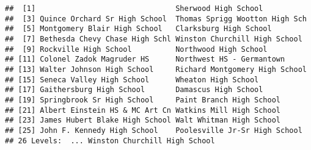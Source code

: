\documentclass[]{article}
\newenvironment{Shaded}{\begin{snugshade}}{\end{snugshade}}
\newcommand{\KeywordTok}[1]{\textcolor[rgb]{0.13,0.29,0.53}{\textbf{#1}}}
\newcommand{\OperatorTok}[1]{\textcolor[rgb]{0.81,0.36,0.00}{\textbf{#1}}}
\newcommand{\NormalTok}[1]{#1}
\begin{document}
\begin{Shaded}
\end{Shaded}

\begin{verbatim}
##  [1]                                Sherwood High School          
##  [3] Quince Orchard Sr High School  Thomas Sprigg Wootton High Sch
##  [5] Montgomery Blair High School   Clarksburg High School        
##  [7] Bethesda Chevy Chase High Schl Winston Churchill High School 
##  [9] Rockville High School          Northwood High School         
## [11] Colonel Zadok Magruder HS      Northwest HS - Germantown     
## [13] Walter Johnson High School     Richard Montgomery High School
## [15] Seneca Valley High School      Wheaton High School           
## [17] Gaithersburg High School       Damascus High School          
## [19] Springbrook Sr High School     Paint Branch High School      
## [21] Albert Einstein HS & MC Art Cn Watkins Mill High School      
## [23] James Hubert Blake High School Walt Whitman High School      
## [25] John F. Kennedy High School    Poolesville Jr-Sr High School 
## 26 Levels:  ... Winston Churchill High School
\end{verbatim}

\begin{Shaded}
\end{Shaded}
\end{document}
